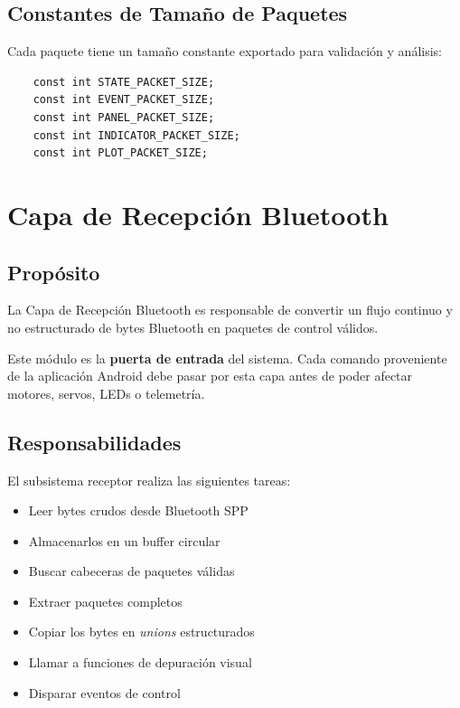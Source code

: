 \documentclass[12pt,a4paper]{article}
\begin{document}
\subsection{Constantes de Tamaño de Paquetes}

Cada paquete tiene un tamaño constante exportado para validación y análisis:

\begin{lstlisting}
	const int STATE_PACKET_SIZE;
	const int EVENT_PACKET_SIZE;
	const int PANEL_PACKET_SIZE;
	const int INDICATOR_PACKET_SIZE;
	const int PLOT_PACKET_SIZE;
\end{lstlisting}

\section{Capa de Recepción Bluetooth}

\subsection{Propósito}

La Capa de Recepción Bluetooth es responsable de convertir un flujo continuo y
no estructurado de bytes Bluetooth en paquetes de control válidos.

Este módulo es la \textbf{puerta de entrada} del sistema.
Cada comando proveniente de la aplicación Android debe pasar por esta capa
antes de poder afectar motores, servos, LEDs o telemetría.

\subsection{Responsabilidades}

El subsistema receptor realiza las siguientes tareas:

\begin{itemize}
	\item Leer bytes crudos desde Bluetooth SPP
	\item Almacenarlos en un buffer circular
	\item Buscar cabeceras de paquetes válidas
	\item Extraer paquetes completos
	\item Copiar los bytes en \textit{unions} estructurados
	\item Llamar a funciones de depuración visual
	\item Disparar eventos de control
\end{itemize}
\end{document}
